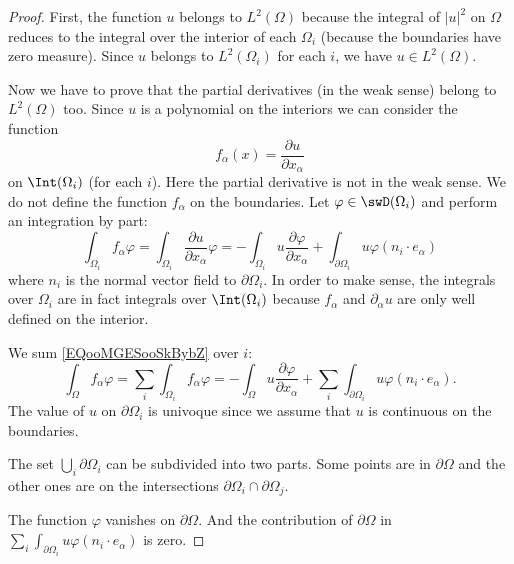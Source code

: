 \begin{proof}
	First, the function \( u\) belongs to \( L^2(\Omega)\) because the integral of \( | u |^2\) on \( \Omega\) reduces to the integral over the interior of each \( \Omega_i\) (because the boundaries have zero measure). Since \( u\) belongs to \( L^2(\Omega_i)\) for each \( i\), we have \( u\in L^2(\Omega)\).

	Now we have to prove that the partial derivatives (in the weak sense) belong to \( L^2(\Omega)\) too. Since \( u\) is a polynomial on the interiors we can consider the function
	\begin{equation}
		f_{\alpha}(x)=\frac{ \partial u }{ \partial x_{\alpha} }
	\end{equation}
	on \( \Int(\Omega_i)\) (for each \( i\)). Here the partial derivative is not in the weak sense. We do not define the function \( f_{\alpha}\) on the boundaries. Let \( \varphi\in \swD(\Omega_i)\) and perform an integration by part:
	\begin{equation}        \label{EQooMGESooSkBybZ}
		\int_{\Omega_i}f_{\alpha}\varphi=\int_{\Omega_i}\frac{ \partial u }{ \partial x_{\alpha} }\varphi=-\int_{\Omega_i}u\frac{ \partial \varphi }{ \partial x_{\alpha} }+\int_{\partial\Omega_i}u\varphi(n_i\cdot e_{\alpha})
	\end{equation}
	where \( n_i\) is the normal vector field to \( \partial\Omega_i\). In order to make sense, the integrals over \( \Omega_i\) are in fact integrals over \( \Int(\Omega_i)\) because \( f_{\alpha}\) and \( \partial_{\alpha}u\) are only well defined on the interior.

	We sum \eqref{EQooMGESooSkBybZ} over \( i\):
	\begin{equation}        \label{EQooKACAooGlBMaQ}
		\int_{\Omega}f_{\alpha}\varphi=\sum_i\int_{\Omega_i}f_{\alpha}\varphi=-\int_{\Omega}u\frac{ \partial \varphi }{ \partial x_{\alpha} }+\sum_i\int_{\partial\Omega_i}u\varphi(n_i\cdot e_{\alpha}).
	\end{equation}
	The value of \( u\) on \( \partial \Omega_i\) is univoque since we assume that \( u\) is continuous on the boundaries.

	The set \( \bigcup_i\partial\Omega_i\) can be subdivided into two parts. Some points are in \( \partial \Omega\) and the other ones are on the intersections \( \partial\Omega_i\cap \partial\Omega_j\).

	The function \( \varphi\) vanishes on \( \partial\Omega\). And the contribution of \( \partial\Omega\) in \( \sum_i\int_{\partial\Omega_i}u\varphi (n_i\cdot e_{\alpha})\) is zero.


\end{proof}
